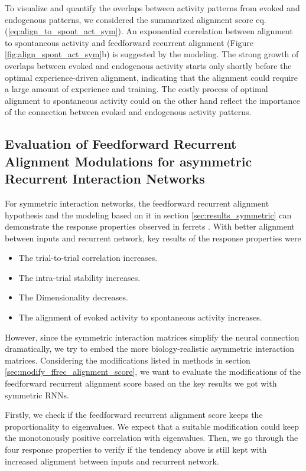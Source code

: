 \documentclass[11pt]{article}
\begin{document}
	To visualize and quantify the overlaps between activity patterns from evoked and endogenous patterns, we considered the summarized alignment score eq.(\ref{eq:align_to_spont_act_sym}). An exponential correlation between alignment to spontaneous activity and feedforward recurrent alignment (Figure \ref{fig:align_spont_act_sym}b) is suggested by the modeling. The strong growth of overlaps between evoked and endogenous activity starts only shortly before the optimal experience-driven alignment, indicating that the alignment could require a large amount of experience and training. The costly process of optimal alignment to spontaneous activity could on the other hand reflect the importance of the connection between evoked and endogenous activity patterns. 
	
	\clearpage
	\subsection{Evaluation of Feedforward Recurrent Alignment Modulations for asymmetric Recurrent Interaction Networks} \label{sec:asymmetric_results}
	For symmetric interaction networks, the feedforward recurrent alignment hypothesis and the modeling based on it in section \ref{sec:results_symmetric} can demonstrate the response properties observed in ferrets \cite{tragenap2023nature}. With better alignment between inputs and recurrent network, key results of the response properties were
		\begin{itemize}
			\item The trial-to-trial correlation increases.
			\item The intra-trial stability increases.
			\item The Dimensionality decreases.
			\item The alignment of evoked activity to spontaneous activity increases.
		\end{itemize}
	
	However, since the symmetric interaction matrices simplify the neural connection dramatically, we try to embed the more biology-realistic asymmetric interaction matrices. Considering the modifications listed in methods in section \ref{sec:modify_ffrec_alignment_score}, we want to evaluate the modifications of the feedforward recurrent alignment score based on the key results we got with symmetric RNNs. 
	
	Firstly, we check if the feedforward recurrent alignment score keeps the proportionality to eigenvalues. We expect that a suitable modification could keep the monotonously positive correlation with eigenvalues. Then, we go through the four response properties to verify if the tendency above is still kept with increased alignment between inputs and recurrent network. 
	\vspace{0.5cm}
\end{document}
